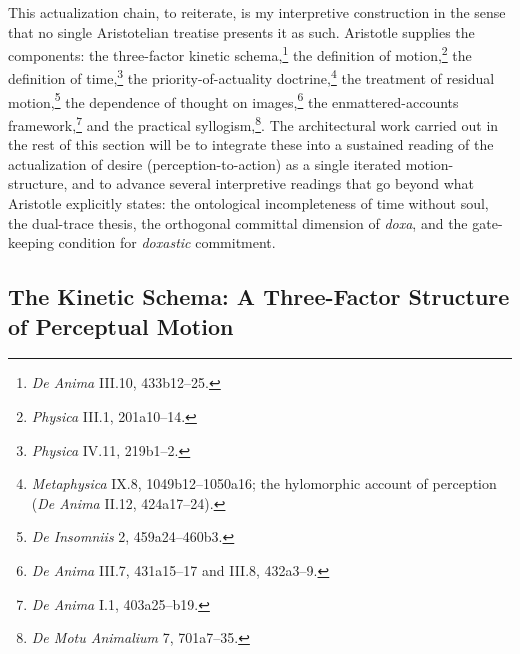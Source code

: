 This actualization chain, to reiterate, is my interpretive construction in the sense that no single Aristotelian treatise presents it as such. Aristotle supplies the components: the three-factor kinetic schema,\footnote{\textit{De Anima} III.10, 433b12--25.} the definition of motion,\footnote{\textit{Physica} III.1, 201a10--14.} the definition of time,\footnote{\textit{Physica} IV.11, 219b1--2.} the priority-of-actuality doctrine,\footnote{\textit{Metaphysica} IX.8, 1049b12--1050a16; the hylomorphic account of perception (\textit{De Anima} II.12, 424a17--24).} the treatment of residual motion,\footnote{\textit{De Insomniis} 2, 459a24--460b3.} the dependence of thought on images,\footnote{\textit{De Anima} III.7, 431a15--17 and III.8, 432a3--9.} the enmattered-accounts framework,\footnote{\textit{De Anima} I.1, 403a25--b19.} and the practical syllogism,\footnote{\textit{De Motu Animalium} 7, 701a7--35.}. The architectural work carried out in the rest of this section will be to integrate these into a sustained reading of the actualization of desire (perception-to-action) as a single iterated motion-structure, and to advance several interpretive readings that go beyond what Aristotle explicitly states: the ontological incompleteness of time without soul, the dual-trace thesis, the orthogonal committal dimension of \textit{doxa}, and the gate-keeping condition for \textit{doxastic} commitment. 

\subsection{The Kinetic Schema: A Three-Factor Structure of Perceptual Motion}

